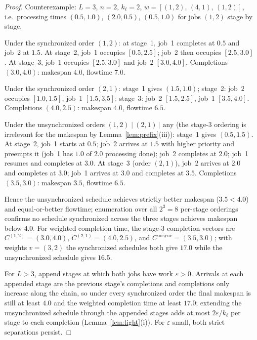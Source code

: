 \documentclass[sn-mathphys,NameDate]{sn-jnl}
\theoremstyle{thmstyleone}
\theoremstyle{thmstylethree}
\theoremstyle{thmstyletwo}
\begin{document}
\begin{proof}
Counterexample: $L = 3$, $n = 2$, $k_\ell = 2$,
$w = [(1,2),\,(4,1),\,(1,2)]$, i.e.\ processing times
$(0.5, 1.0)$, $(2.0, 0.5)$, $(0.5, 1.0)$ for jobs $(1,2)$
stage by stage.

Under the synchronized order $(1,2)$: at stage~1, job~1
completes at $0.5$ and job~2 at $1.5$. At stage~2, job~1
occupies $[0.5, 2.5]$; job~2 then occupies $[2.5, 3.0]$. At
stage~3, job~1 occupies $[2.5, 3.0]$ and job~2 $[3.0, 4.0]$.
Completions $(3.0, 4.0)$: makespan $4.0$, flowtime $7.0$.

Under the synchronized order $(2,1)$: stage~1 gives
$(1.5, 1.0)$; stage~2: job~2 occupies $[1.0, 1.5]$, job~1
$[1.5, 3.5]$; stage~3: job~2 $[1.5, 2.5]$, job~1
$[3.5, 4.0]$. Completions $(4.0, 2.5)$: makespan $4.0$,
flowtime $6.5$.

Under the unsynchronized orders
$(1,2) \mid (2,1) \mid \text{any}$ (the stage-3 ordering is
irrelevant for the makespan by
Lemma~\ref{lem:prefix}(iii)): stage~1 gives $(0.5, 1.5)$. At
stage~2, job~1 starts at $0.5$; job~2 arrives at $1.5$ with
higher priority and preempts it (job~1 has $1.0$ of $2.0$
processing done); job~2 completes at $2.0$; job~1 resumes and
completes at $3.0$. At stage~3 (order $(2,1)$), job~2 arrives
at $2.0$ and completes at $3.0$; job~1 arrives at $3.0$ and
completes at $3.5$. Completions $(3.5, 3.0)$: makespan $3.5$,
flowtime $6.5$.

Hence the unsynchronized schedule achieves strictly better
makespan ($3.5 < 4.0$) and equal-or-better flowtime;
enumeration over all $2^3 = 8$ per-stage orderings confirms no
schedule synchronized across the three stages achieves
makespan below $4.0$. For weighted completion time, the
stage-3 completion vectors are $C^{(1,2)} = (3.0, 4.0)$,
$C^{(2,1)} = (4.0, 2.5)$, and
$C^{\mathrm{unsync}} = (3.5, 3.0)$; with weights $v = (3,2)$
the synchronized schedules both give $17.0$ while the
unsynchronized schedule gives $16.5$.

For $L > 3$, append stages at which both jobs have work
$\varepsilon > 0$. Arrivals at each appended stage are the
previous stage's completions and completions only increase
along the chain, so under every synchronized order the final
makespan is still at least $4.0$ and the weighted completion
time at least $17.0$; extending the unsynchronized schedule
through the appended stages adds at most $2\varepsilon/k_\ell$
per stage to each completion
(Lemma~\ref{lem:light}(i)). For $\varepsilon$ small, both
strict separations persist.
\end{proof}
\end{document}
